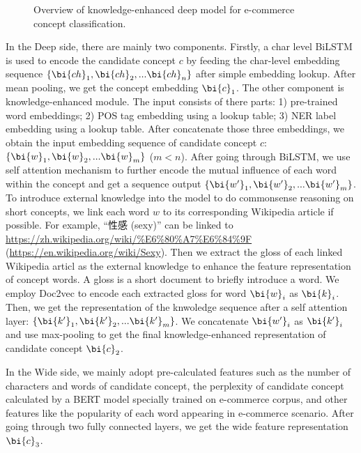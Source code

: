\begin{figure}[th]
	\centering
	\caption{Overview of knowledge-enhanced deep model for e-commerce concept classification.
	}
	\label{fig:classification}
\end{figure}


In the Deep side,
there are mainly two components.
Firstly, a char level BiLSTM is used to encode the candidate concept $c$
by feeding the char-level embedding sequence $\{\bi{ch}_1, \bi{ch}_2,...\bi{ch}_n\}$
after simple embedding lookup.
After mean pooling,
we get the concept embedding $\bi{c}_1$.
The other component is knowledge-enhanced module.
The input consists of there parts:
1) pre-trained word embeddings; 2) POS tag \cite{toutanova2003feature} embedding using a lookup table; 3) NER label \cite{finkel2005incorporating} embedding using a lookup table.
After concatenate those three embeddings, 
we obtain the input embedding sequence of candidate concept $c$: 
$\{\bi{w}_1, \bi{w}_2,...\bi{w}_m\}$ ($m<n$).
After going through BiLSTM, we use self attention mechanism \cite{vaswani2017attention} to further encode the mutual influence of each word within the concept and get a sequence output 
$\{\bi{w'}_1, \bi{w'}_2,...\bi{w'}_m\}$.
To introduce external knowledge into the model to do commonsense reasoning on short concepts,
we link each word $w$ to its corresponding Wikipedia article if possible.
For example, ``性感 (sexy)'' can be linked to \url{https://zh.wikipedia.org/wiki/%E6%80%A7%E6%84%9F}
	(\url{https://en.wikipedia.org/wiki/Sexy}).
Then we extract the gloss of each linked Wikipedia articl as the external knowledge to enhance the feature representation of concept words.
A gloss is a short document to briefly introduce a word.
We employ Doc2vec \cite{le2014distributed} to encode each extracted gloss for word $\bi{w}_i$ as $\bi{k}_i$.
Then, we get the representation of the knwoledge sequence after a self attention layer:
$\{\bi{k'}_1, \bi{k'}_2,...\bi{k'}_m\}$.
We concatenate  $\bi{w'}_i$ as $\bi{k'}_i$ and use max-pooling to get the final knowledge-enhanced representation of candidate concept $\bi{c}_2$.

In the Wide side, 
we mainly adopt pre-calculated features such as the number of characters and words of candidate concept,
the perplexity of candidate concept calculated by 
a BERT \cite{devlin2018bert} model specially trained on e-commerce corpus, and other features like the popularity of each word appearing in e-commerce scenario.
After going through two fully connected layers, 
we get the wide feature representation $\bi{c}_3$.

